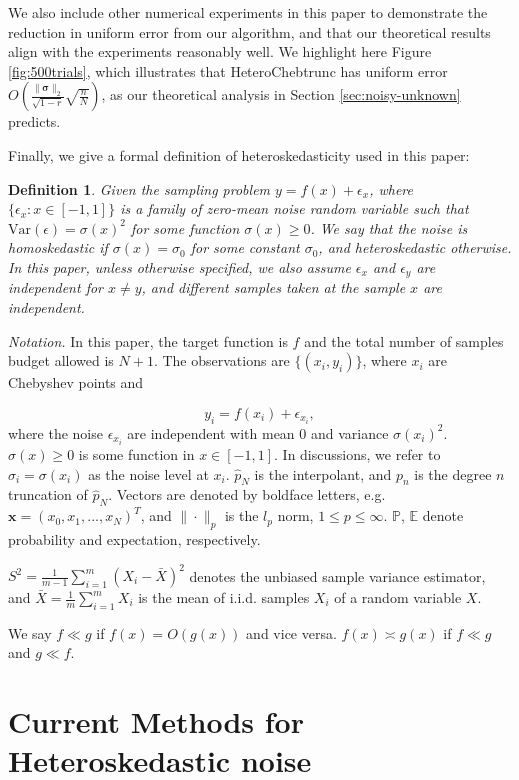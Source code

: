 \documentclass[pdflatex,sn-mathphys-num]{sn-jnl}%
\theoremstyle{thmstyleone}%
\theoremstyle{thmstyletwo}%
\newtheorem{definition}{Definition}%
\theoremstyle{thmstylethree}%
\begin{document}
We also include other numerical experiments in this paper to demonstrate the reduction in uniform error from our algorithm, and that our theoretical results align with the experiments reasonably well. We highlight here Figure \ref{fig:500trials}, which illustrates that HeteroChebtrunc has uniform error $O(\frac{\|\bm{\sigma}\|_2}{\sqrt{1-r}}\sqrt{\frac{n}{N}})$, as our theoretical analysis in Section \ref{sec:noisy-unknown} predicts.

Finally, we give a formal definition of heteroskedasticity used in this paper:

\begin{definition}\label{def:hetero}
	Given the sampling problem $y=f(x) + \epsilon_x$, where $\{\epsilon_x:x\in [-1,1]\}$ is a family of zero-mean noise random variable such that $\text{Var}(\epsilon) = \sigma(x)^2$ for some function $\sigma(x)\geq 0$. We say that the noise is \emph{homoskedastic} if $\sigma(x) = \sigma_0$ for some constant $\sigma_0$, and \emph{heteroskedastic} otherwise. In this paper, unless otherwise specified, we also assume $\epsilon_x$ and $\epsilon_y$ are independent for $x\neq y$, and different samples taken at the sample $x$ are independent.
\end{definition}

\textit{Notation.} In this paper, the target function is $f$ and the total number of samples budget allowed is $N+1$. The observations are $\{(x_i,y_i)\}$, where $x_i$ are Chebyshev points and

\[y_i = f(x_i) + \epsilon_{x_i},\]
where the noise $\epsilon_{x_i}$ are independent with mean 0 and variance $\sigma(x_i)^2$. $\sigma(x) \geq 0$ is some function in $x\in [-1,1]$. In discussions, we refer to $\sigma_i = \sigma(x_i)$ as the noise level at $x_i$. $\hat{p}_N$ is the interpolant, and $p_n$ is the degree $n$ truncation of $\hat{p}_N$. Vectors are denoted by boldface letters, e.g. $\bm{x} = (x_0, x_1,...,x_N)^T$, and $\| \cdot\|_p$ is the $l_p$ norm, $1\leq p\leq \infty$. $\mathbb{P}$, $\mathbb{E}$ denote probability and expectation, respectively.

$S^2 = \frac{1}{m-1} \sum_{i=1}^{m} (X_i - \bar{X})^2$ denotes the unbiased sample variance estimator, and $\bar{X} = \frac{1}{m}\sum_{i=1}^{m}X_i$ is the mean of i.i.d. samples $X_i$ of a random variable $X$. 

We say $f \ll g$ if $f(x) = O(g(x))$ and vice versa. $f(x) \asymp g(x)$ if $f\ll g$ and $g \ll f$. 

\section{Current Methods for Heteroskedastic noise}\label{sec:lit-review}
\end{document}
